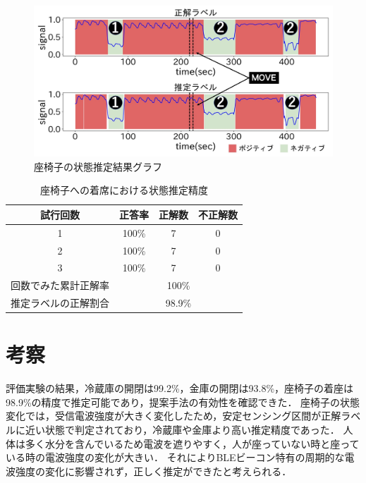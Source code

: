 \begin{figure}[tbh]
    \centering
    \includegraphics[width=14cm]{images/chapter3/zaisu_graph.jpg}
    \caption{座椅子の状態推定結果グラフ}
    \label{chair_graph}
\end{figure}


\begin{table}[tbh]
    \begin{center}
        \caption{座椅子への着席における状態推定精度}
        \label{chair_fig}
        \begin{tabular}{|c|c|c|c|} \hline
        試行回数 & 正答率 & 正解数 & 不正解数 \\ \hline
        1 & 100\% & 7 & 0 \\ \hline
        2 & 100\% & 7 & 0 \\ \hline
        3 & 100\% & 7 & 0 \\ \hline \hline
        回数でみた累計正解率 & \multicolumn{3}{c|}{100\%} \\ \hline \hline
        推定ラベルの正解割合 & \multicolumn{3}{c|}{98.9\%} \\ \hline

        \end{tabular}
    \end{center}
\end{table}


\section{考察}
評価実験の結果，冷蔵庫の開閉は99.2\%，金庫の開閉は93.8\%，座椅子の着座は98.9\%の精度で推定可能であり，提案手法の有効性を確認できた．
座椅子の状態変化では，受信電波強度が大きく変化したため，安定センシング区間が正解ラベルに近い状態で判定されており，冷蔵庫や金庫より高い推定精度であった．
人体は多く水分を含んでいるため電波を遮りやすく，人が座っていない時と座っている時の電波強度の変化が大きい．
それによりBLEビーコン特有の周期的な電波強度の変化に影響されず，正しく推定ができたと考えられる．

